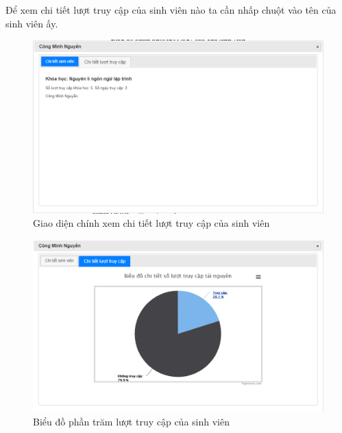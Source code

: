 \newpage
Để xem chi tiết lượt truy cập của sinh viên nào ta cần nhấp chuột vào tên của sinh viên ấy.

\begin{center}
	\begin{figure}[htp]
		\begin{center}
			\includegraphics[width=0.9\linewidth]{img/40}
		\end{center}
		\caption{Giao diện chính xem chi tiết lượt truy cập của sinh viên}
		\label{refhinh67}
	\end{figure}
\end{center}

\begin{center}
	\begin{figure}[htp]
		\begin{center}
			\includegraphics[width=0.9\linewidth]{img/41}
		\end{center}
		\caption{Biểu đồ phần trăm lượt truy cập của sinh viên}
		\label{refhinh68}
	\end{figure}
\end{center}

